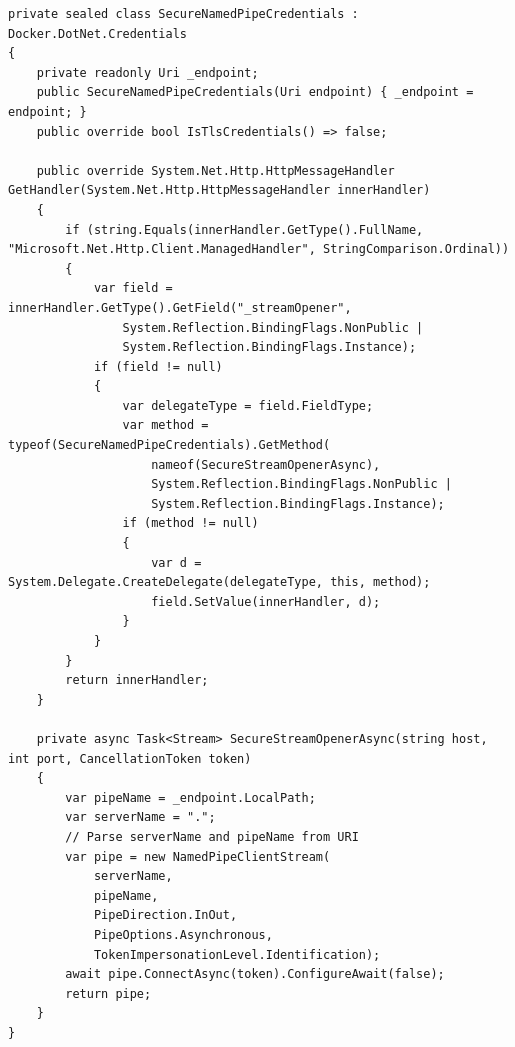 \begin{lstlisting}[language=CSharp, caption={Windows Named Pipe Impersonation Override}, label={lst:namedpipe}]
private sealed class SecureNamedPipeCredentials : Docker.DotNet.Credentials
{
    private readonly Uri _endpoint;
    public SecureNamedPipeCredentials(Uri endpoint) { _endpoint = endpoint; }
    public override bool IsTlsCredentials() => false;

    public override System.Net.Http.HttpMessageHandler GetHandler(System.Net.Http.HttpMessageHandler innerHandler)
    {
        if (string.Equals(innerHandler.GetType().FullName, "Microsoft.Net.Http.Client.ManagedHandler", StringComparison.Ordinal))
        {
            var field = innerHandler.GetType().GetField("_streamOpener", 
                System.Reflection.BindingFlags.NonPublic | 
                System.Reflection.BindingFlags.Instance);
            if (field != null)
            {
                var delegateType = field.FieldType;
                var method = typeof(SecureNamedPipeCredentials).GetMethod(
                    nameof(SecureStreamOpenerAsync), 
                    System.Reflection.BindingFlags.NonPublic | 
                    System.Reflection.BindingFlags.Instance);
                if (method != null)
                {
                    var d = System.Delegate.CreateDelegate(delegateType, this, method);
                    field.SetValue(innerHandler, d);
                }
            }
        }
        return innerHandler;
    }

    private async Task<Stream> SecureStreamOpenerAsync(string host, int port, CancellationToken token)
    {
        var pipeName = _endpoint.LocalPath;
        var serverName = ".";
        // Parse serverName and pipeName from URI
        var pipe = new NamedPipeClientStream(
            serverName,
            pipeName,
            PipeDirection.InOut,
            PipeOptions.Asynchronous,
            TokenImpersonationLevel.Identification);
        await pipe.ConnectAsync(token).ConfigureAwait(false);
        return pipe;
    }
}
\end{lstlisting}

